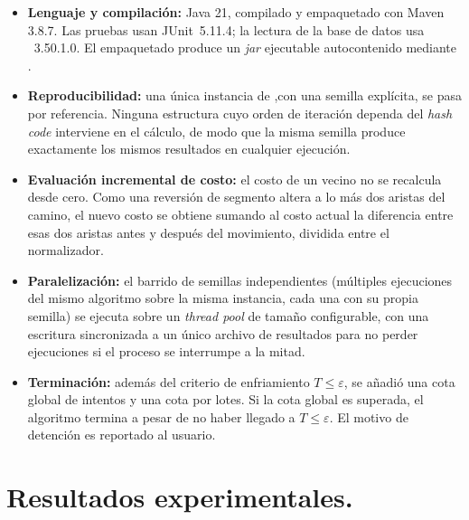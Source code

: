 \documentclass[9pt,a4paper,twocolumn,twoside]{tau-class/tau}
\begin{document}
\begin{itemize}
    \item \textbf{Lenguaje y compilación:} Java 21, compilado y empaquetado con Maven 3.8.7. Las pruebas usan JUnit~5.11.4; la lectura de la base de datos usa ~3.50.1.0. El empaquetado produce un \emph{jar} ejecutable autocontenido mediante .\\
    
    \item \textbf{Reproducibilidad:} una única instancia de ,con una semilla explícita, se pasa por referencia. Ninguna estructura cuyo orden de iteración dependa del \textit{hash code} interviene en el cálculo, de modo que la misma semilla produce exactamente los mismos resultados en cualquier ejecución.\\
    
    \item \textbf{Evaluación incremental de costo:} el costo de un vecino no se recalcula desde cero. Como una reversión de segmento altera a lo más dos aristas del camino, el nuevo costo se obtiene sumando al costo actual la diferencia entre esas dos aristas antes y después del movimiento, dividida entre el normalizador.\\
    
    \item \textbf{Paralelización:} el barrido de semillas independientes (múltiples ejecuciones del mismo algoritmo sobre la misma instancia, cada una con su propia semilla) se ejecuta sobre un \textit{thread pool} de tamaño configurable, con una escritura sincronizada a un único archivo de resultados para no perder ejecuciones si el proceso se interrumpe a la mitad.\\
    
    \item \textbf{Terminación:} además del criterio de enfriamiento $T \le \varepsilon$, se añadió una cota global de intentos y una cota por lotes. Si la cota global es superada, el algoritmo termina a pesar de no haber llegado a $T \le \varepsilon$. El motivo de detenci\'on es reportado al usuario.
\end{itemize}

\section{Resultados experimentales.}
\end{document}

